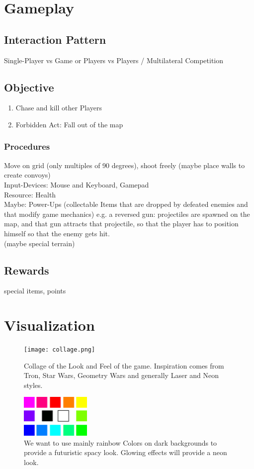 \documentclass[10pt,a4paper]{article}
\begin{document}
\section{Gameplay}
\subsection{Interaction Pattern}
Single-Player vs Game or Players vs Players / Multilateral Competition \\
\subsection{Objective}
\begin{enumerate}
  \item Chase and kill other Players
  \item Forbidden Act: Fall out of the map
\end{enumerate}
\subsubsection{Procedures}
Move on grid (only multiples of 90 degrees), shoot freely (maybe place walls to create convoys)\\
Input-Devices: Mouse and Keyboard, Gamepad \\
Resource: Health \\
Maybe: Power-Ups (collectable Items that are dropped by defeated enemies and that modify game mechanics) e.g. a reversed gun: projectiles are spawned on the map, and
that gun attracts that projectile, so that the player has to position himself so that the enemy gets hit.\\
(maybe special terrain)
\subsection{Rewards}
special items, points

\section{Visualization}


\begin{figure}[H]
  \centering
  \texttt{[image: collage.png]}
  \caption{Collage of the Look and Feel of the game. Inspiration comes from Tron, Star Wars, Geometry Wars and generally Laser and Neon styles.}
  \label{fig:figure1}
\end{figure}

\begin{figure}[H]
  \centering
  \includegraphics[width=0.3\textwidth]{colorpalette2.png}
  \caption{We want to use mainly rainbow Colors on dark backgrounds to provide a futuristic spacy look. Glowing effects will provide a neon look.}
  \label{fig:figure2}
\end{figure}
\end{document}
